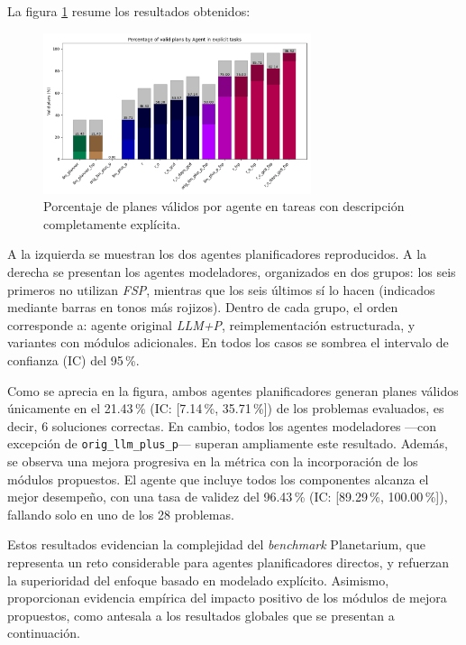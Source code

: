 La figura \ref{fig:plans} resume los resultados obtenidos:

\begin{figure}[H]
\centering
\includegraphics[width=0.7\textwidth]{Graphics/valid_plans_by_agent.png}
\caption{Porcentaje de planes válidos por agente en tareas con descripción completamente explícita.}
\label{fig:plans}
\end{figure}

A la izquierda se muestran los dos agentes planificadores reproducidos. A la derecha se presentan los agentes modeladores, organizados en dos grupos: los seis primeros no utilizan \textit{FSP}, mientras que los seis últimos sí lo hacen (indicados mediante barras en tonos más rojizos). Dentro de cada grupo, el orden corresponde a: agente original \textit{LLM+P}, reimplementación estructurada, y variantes con módulos adicionales. En todos los casos se sombrea el intervalo de confianza (IC) del 95\,\%.

Como se aprecia en la figura, ambos agentes planificadores generan planes válidos únicamente en el 21.43\,\% (IC: [7.14\,\%, 35.71\,\%]) de los problemas evaluados, es decir, 6 soluciones correctas. En cambio, todos los agentes modeladores ---con excepción de \texttt{orig\_llm\_plus\_p}--- superan ampliamente este resultado. Además, se observa una mejora progresiva en la métrica con la incorporación de los módulos propuestos. El agente que incluye todos los componentes alcanza el mejor desempeño, con una tasa de validez del 96.43\,\% (IC: [89.29\,\%, 100.00\,\%]), fallando solo en uno de los 28 problemas.

Estos resultados evidencian la complejidad del \textit{benchmark} Planetarium, que representa un reto considerable para agentes planificadores directos, y refuerzan la superioridad del enfoque basado en modelado explícito. Asimismo, proporcionan evidencia empírica del impacto positivo de los módulos de mejora propuestos, como antesala a los resultados globales que se presentan a continuación.

